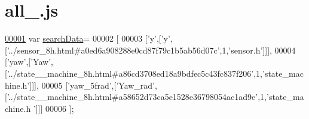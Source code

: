 \hypertarget{all__19_8js_source}{}\section{all\+\_.\+js}
\label{all__19_8js_source}

\begin{DoxyCode}
\hypertarget{all__19_8js_source.tex_l00001}{}\hyperlink{all__19_8js_ad01a7523f103d6242ef9b0451861231e}{00001} var \hyperlink{all__19_8js_ad01a7523f103d6242ef9b0451861231e}{searchData}=
00002 [
00003   [\textcolor{charliteral}{'y'},[\textcolor{charliteral}{'y'},[\textcolor{stringliteral}{'../sensor\_8h.html#a0ed6a908288e0cd87f79c1b5ab56d07c'},1,\textcolor{stringliteral}{'sensor.h'}]]],
00004   [\textcolor{stringliteral}{'yaw'},[\textcolor{stringliteral}{'Yaw'},[\textcolor{stringliteral}{'../state\_\_machine\_8h.html#a86cd3708ed18a9bdfec5c43fc837f206'},1,\textcolor{stringliteral}{'state\_machine.h'}]]],
00005   [\textcolor{stringliteral}{'yaw\_5frad'},[\textcolor{stringliteral}{'Yaw\_rad'},[\textcolor{stringliteral}{'../state\_\_machine\_8h.html#a58652d73ca5e1528e36798054ac1ad9e'},1,\textcolor{stringliteral}{'state\_machine.h
      '}]]]
00006 ];
\end{DoxyCode}
